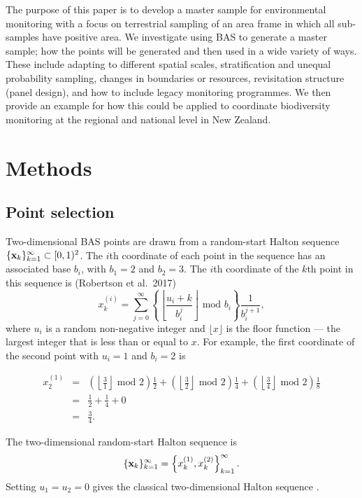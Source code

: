 \documentclass[titlepage]{article}
\begin{document}
The purpose of this paper is to develop a master sample for environmental monitoring with a focus on terrestrial sampling of an area frame in which all sub-samples have positive area. We investigate using BAS to generate a master sample; how the points will be generated and then used in a wide variety of ways. These include adapting to different spatial scales, stratification and unequal probability sampling, changes in boundaries or resources, revisitation structure (panel design), and how to include legacy monitoring programmes. We then provide an example for how this could be applied to coordinate biodiversity monitoring at the regional and national level in New Zealand.

\section{Methods}
\subsection{Point selection}

Two-dimensional BAS points are drawn from a random-start Halton sequence $\{{\bf x}_k\}_{k=1}^{\infty} \subset [0,1)^2$. The $i$th coordinate of each point in the sequence has an associated base $b_i$, with $b_1 = 2$ and $b_2 = 3$. The $i$th coordinate of the $k$th point in this sequence is (Robertson et al.\ 2017)
$$
x_k^{(i)} = \sum_{j = 0}^{\infty} \left\{\left\lfloor \frac{u_i + k}{b_i^j} \right\rfloor \text{ mod } b_i \right\}\frac{1}{b_i^{j+1}},
$$
where $u_i$ is a random non-negative integer and $\lfloor x \rfloor$ is the floor function --- the largest integer that is less than or equal to $x$. For example, the first coordinate of the second point with $u_i = 1$ and $b_i = 2$ is

\begin{eqnarray*}
x^{(1)}_{2} & = & \left(\left\lfloor \frac{3}{1} \right\rfloor \text{ mod } 2 \right)\frac{1}{2} + \left(\left\lfloor \frac{3}{2} \right\rfloor \text{ mod } 2 \right) \frac{1}{4} +\left(\left\lfloor \frac{3}{4} \right\rfloor \text{ mod } 2 \right) \frac{1}{8}\\
& = & \frac{1}{2} + \frac{1}{4} + 0\\
& = & \frac{3}{4}.
\end{eqnarray*}

\noindent The two-dimensional random-start Halton sequence is 
\begin{equation}\label{BASeq}
\{{\bf x}_k\}_{k=1}^{\infty} = \left\{x_k^{(1)}, x_k^{(2)}\right\}_{k=1}^{\infty}.
\end{equation}
Setting $u_1 = u_2 = 0$ gives the classical two-dimensional Halton sequence \citep{Halton1960}. 
\end{document}
